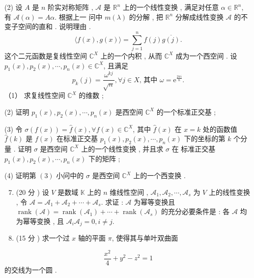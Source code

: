 \documentclass[10pt]{article}
\begin{document}
(2)  设  $A$  是  $n$  阶实对称矩阵 , $\mathscr{A}$  是  $\mathbb{R}^{n}$  上的一个线性变换 ,  满足对任意  $\alpha \in \mathbb{R}^{n}$,  有  $\mathscr{A}(\alpha)=A \alpha$.  根据上一   问中  $m(\lambda)$  的分解 ,  把  $\mathbb{R}^{n}$  分解成线性变换  $\mathscr{A}$  的不变子空间的直和 .  说明理由 .
$$
\langle f(x), g(x)\rangle=\sum_{j=1}^{n} f(j) \overline{g(j)} .
$$
 这个二元函数是复线性空间  $\mathbb{C}^{X}$  上的一个内积 ,  从而  $\mathbb{C}^{X}$  成为一个西空间 .  设  $p_{1}(x), p_{2}(x), \cdots, p_{n}(x) \in \mathbb{C}^{X}$,  且满足 
$$
p_{k}(j)=\frac{\omega^{k j}}{\sqrt{n}}, \forall j \in X \text {, 其中 } \omega=\mathrm{e}^{\frac{2 \pi i}{n}} .
$$
（1） 求复线性空间  $\mathbb{C}^{X}$  的维数 ;

(2)  证明  $p_{1}(x), p_{2}(x), \cdots, p_{n}(x)$  是西空间  $\mathbb{C}^{X}$  的一个标准正交基 ;

(3)  令  $\sigma(f(x))=\hat{f}(x), \forall f(x) \in \mathbb{C}^{X}$,  其中  $\hat{f}(x)$  在  $x=k$  处的函数值  $\hat{f}(k)$  是  $f(x)$  在标准正交基  $p_{1}(x), p_{2}(x), \cdots, p_{n}(x)$  下的坐标的第  $k$  个分量 .  证明  $\sigma$  是西空间  $\mathbb{C}^{X}$  上的一个线性变换 ,  并且求  $\sigma$  在   标准正交基  $p_{1}(x), p_{2}(x), \cdots, p_{n}(x)$  下的矩阵 ;

(4)  证明第  $(3)$  小问中的  $\sigma$  是西空间  $\mathbb{C}^{X}$  上的一个西变换 .

\begin{enumerate}
  \setcounter{enumi}{6}
  \item (20  分 )  设  $V$  是数域  $\mathbb{K}$  上的  $n$  维线性空间 , $\mathscr{A}_{1}, \mathscr{A}_{2}, \cdots, \mathscr{A}_{s}$  为  $V$  上的线性变换 ,  令  $\mathscr{A}=\mathscr{A}_{1}+\mathscr{A}_{2}+\cdots+\mathscr{A}_{s}$.  求证 : $\mathscr{A}$  为幂等变换且  $\operatorname{rank}(\mathscr{A})=\operatorname{rank}\left(\mathscr{A}_{1}\right)+\cdots+\operatorname{rank}\left(\mathscr{A}_{s}\right)$  的充分必要条件是 :  各  $\mathscr{A}$  均为幂等变换 ,  且  $\mathscr{A}_{i} \mathscr{A}_{j}=0, i \neq j .$

  \item (15  分 )  求一个过  $x$  轴的平面  $\pi$,  使得其与单叶双曲面 

\end{enumerate}
$$
\frac{x^{2}}{4}+y^{2}-z^{2}=1
$$
 的交线为一个圆 .
\end{document}
